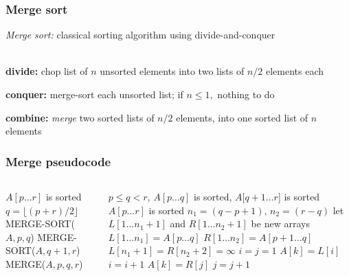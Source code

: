 \documentclass{beamer}
\newcommand{\stanza}{ \\~\ }
\begin{document}
\begin{frame} \frametitle{Merge sort}
  \emph{Merge sort:} classical sorting algorithm using divide-and-conquer \stanza

  \textbf{divide:} chop list of $n$ unsorted elements into two lists of $n/2$
    elements each

  \textbf{conquer:} merge-sort each unsorted list; if $n \leq 1,$ nothing to do

  \textbf{combine:} \emph{merge} two sorted lists of $n/2$ elements, into one
    sorted list of $n$ elements

\end{frame}

\begin{frame} \frametitle{Merge pseudocode}

  \begin{columns}
  \begin{column}{0.4\textwidth}
    {\tiny
      \begin{algorithmic}[1]
        \Ensure $A[p \ldots r]$ is sorted
          \State $q = \lfloor (p+r) / 2 \rfloor$
          \State MERGE-SORT($A, p, q$)
          \State MERGE-SORT($A, q+1, r$)
          \State MERGE($A, p, q, r$)
        \EndIf
        \EndFunction
      \end{algorithmic}
    }
\end{column}
\begin{column}{0.6\textwidth}

    {\tiny
    \begin{algorithmic}[1]
      \Require $p \leq q < r$, $A[p \ldots q]$ is sorted, $A[q+1 \ldots r$] is sorted
      \Ensure $A[p \ldots r]$ is sorted
      \State $n_1 = (q-p+1), \, n_2 = (r-q)$
      \State let $L[1 \ldots n_1+1]$ and $R[1 \ldots n_2 + 1]$ be new arrays
      \State $L[1 \ldots n_1] = A[p \ldots q]$
      \State $R[1 \ldots n_2] = A[p+1 \ldots q]$
      \State $L[n_1+1] = R[n_2+2] = \infty$
      \State $i = j = 1$
              \State $A[k] = L[i]$
              \State $i = i + 1$
          \Else
              \State $A[k] = R[j]$
              \State $j = j + 1$
          \EndIf
      \EndFor
      \EndFunction
    \end{algorithmic}
    }

\end{column}
\end{columns}
\end{frame}
\end{document}
